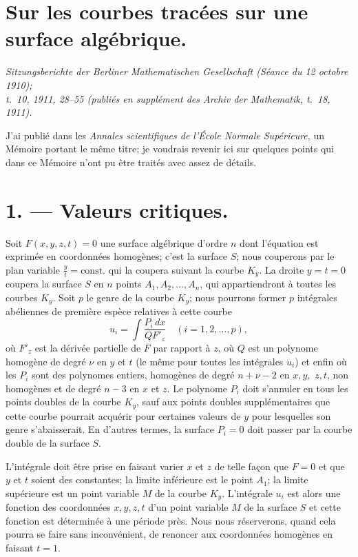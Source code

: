 \documentclass{article}
\begin{document}
\section*{Sur les courbes tracées sur une surface algébrique.}

\begin{center}
\emph{Sitzungsberichte der Berliner Mathematischen Gesellschaft (Séance du 12 octobre 1910);}\\
\emph{t.~10, 1911, 28--55 (publiés en supplément des Archiv der Mathematik, t.~18, 1911).}
\end{center}

J'ai publié dans les \emph{Annales scientifiques de l'École Normale Supérieure}, un Mémoire portant le même titre; je voudrais revenir ici sur quelques points qui dans ce Mémoire n'ont pu être traités avec assez de détails.

\section*{1. --- Valeurs critiques.}

Soit $F(x, y, z, t) = 0$ une surface algébrique d'ordre $n$ dont l'équation est exprimée en coordonnées homogènes; c'est la surface $S$; nous couperons par le plan variable $\frac{y}{t} = \text{const.}$ qui la coupera suivant la courbe $K_{y}$. La droite $y = t = 0$ coupera la surface $S$ en $n$ points $A_{1}, A_{2}, \ldots, A_{n}$, qui appartiendront à toutes les courbes $K_{y}$. Soit $p$ le genre de la courbe $K_{y}$; nous pourrons former $p$ intégrales abéliennes de première espèce relatives à cette courbe
\[
u_{i} = \int \frac{P_{i}\,dx}{Q F'_{z}} \quad (i = 1, 2, \ldots, p),
\]
où $F'_{z}$ est la dérivée partielle de $F$ par rapport à $z$, où $Q$ est un polynome homogène de degré $\nu$ en $y$ et $t$ (le même pour toutes les intégrales $u_{i}$) et enfin où les $P_{i}$ sont des polynomes entiers, homogènes de degré $n + \nu - 2$ en $x, y,$
$z, t$, non homogènes et de degré $n - 3$ en $x$ et $z$. Le polynome $P_{i}$ doit s'annuler en tous les points doubles de la courbe $K_{y}$, sauf aux points doubles supplémentaires que cette courbe pourrait acquérir pour certaines valeurs de $y$ pour lesquelles son genre s'abaisserait. En d'autres termes, la surface $P_{i} = 0$ doit passer par la courbe double de la surface $S$.

L'intégrale doit être prise en faisant varier $x$ et $z$ de telle façon que $F = 0$ et que $y$ et $t$ soient des constantes; la limite inférieure est le point $A_{1}$; la limite supérieure est un point variable $M$ de la courbe $K_{y}$. L'intégrale $u_{i}$ est alors une fonction des coordonnées $x, y, z, t$ d'un point variable $M$ de la surface $S$ et cette fonction est déterminée à une période près. Nous nous réserverons, quand cela pourra se faire sans inconvénient, de renoncer aux coordonnées homogènes en faisant $t = 1$.
\end{document}
